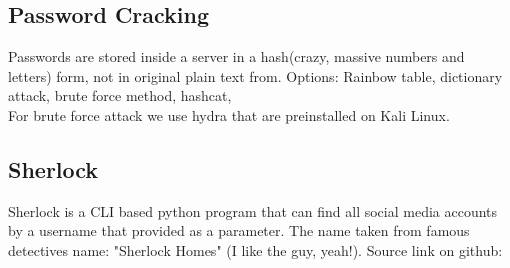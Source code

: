 \documentclass[12 pt, letterpaper]{extarticle}
\begin{document}
\subsection{Password Cracking}
Passwords are stored inside a server in a hash(crazy, massive numbers and letters) form, not in original plain text from.
Options: Rainbow table, dictionary attack, brute force method, hashcat, \\
For brute force attack we use hydra that are preinstalled on Kali Linux.

\subsection*{Sherlock}
Sherlock is a CLI based python program that can find all social media accounts by a username that provided as a parameter. The name taken from famous detectives name: "Sherlock Homes" (I like the guy, yeah!). Source link on github: %
\end{document}
